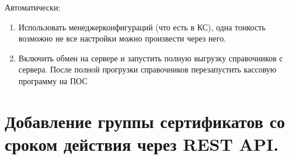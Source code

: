 \documentclass[twoside,11pt,a4paper,notitlepage]{report}
\begin{document}
\sphinxAtStartPar
Автоматически:
\begin{enumerate}
%
\item {} 
\sphinxAtStartPar
Использовать менеджер\sphinxhyphen{}конфигураций (что есть в КС), одна тонкость \sphinxhyphen{} возможно не все настройки можно произвести через него.

\item {} 
\sphinxAtStartPar
Включить обмен на сервере и запустить полную выгрузку справочников с сервера. После полной прогрузки справочников \sphinxhyphen{} перезапустить кассовую программу на ПОС

\end{enumerate}

\sphinxstepscope


\section{Добавление группы сертификатов со сроком действия через REST API.}
\label{\detokenize{sert:rest-api}}\label{\detokenize{sert::doc}}
\sphinxAtStartPar
{}
\end{document}
